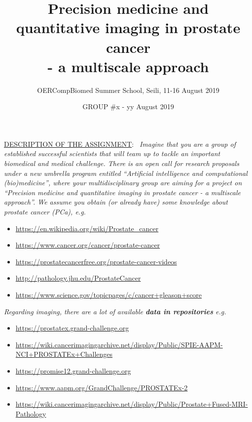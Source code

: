 \documentclass[11pt]{article}
\title{Precision medicine and quantitative imaging in prostate cancer \\ - a multiscale approach}
\author{OERCompBiomed Summer School, Seili, 11-16 August 2019}
\date{GROUP \#x  - yy August 2019}
\begin{document}
\maketitle

\begin{scriptsize}
\noindent \underline{DESCRIPTION OF THE ASSIGNMENT}: \, {\it Imagine that you are a group of established successful scientists that will team up to tackle an important biomedical and medical challenge. There is an open call for research proposals under a new umbrella program entitled “Artificial intelligence and computational (bio)medicine”, where your multidisciplinary group are aiming for a project on “Precision medicine and quantitative imaging in prostate cancer - a multiscale approach”.  
We assume you obtain (or already have) some knowledge about prostate cancer (PCa), e.g.}

\begin{center}
\begin{itemize}
    \item \url{https://en.wikipedia.org/wiki/Prostate_cancer}
    \item \url{https://www.cancer.org/cancer/prostate-cancer}
    \item \url{https://prostatecancerfree.org/prostate-cancer-videos}
    \item \url{http://pathology.jhu.edu/ProstateCancer}
    \item \url{https://www.science.gov/topicpages/c/cancer+gleason+score}
\end{itemize}
\end{center}


{\it Regarding imaging, there are a lot of available {\bf data in repositories} e.g.}


\begin{center}
\begin{itemize}
    \item \url{https://prostatex.grand-challenge.org}
    \item \url{https://wiki.cancerimagingarchive.net/display/Public/SPIE-AAPM-NCI+PROSTATEx+Challenges}
    \item \url{https://promise12.grand-challenge.org}
    \item \url{https://www.aapm.org/GrandChallenge/PROSTATEx-2}
    \item \url{https://wiki.cancerimagingarchive.net/display/Public/Prostate+Fused-MRI-Pathology}
\end{itemize}
\end{center}



\end{scriptsize}
\end{document}
